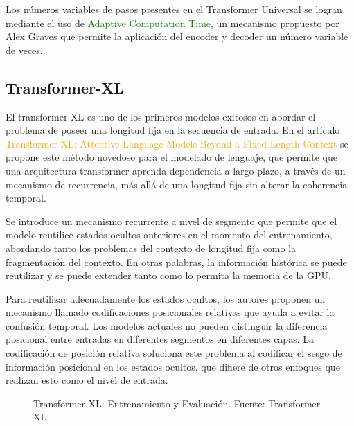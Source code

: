 \documentclass[conference]{IEEEtran}
\begin{document}
Los n\'umeros variables de pasos presentes en el Transformer Universal se logran mediante el uso de \textcolor{green}{Adaptive Computation Time}, un mecanismo propuesto por Alex Graves \cite{b6} que permite la aplicaci\'on del encoder y decoder un n\'umero variable de veces.
	
\vspace{0.2cm}

\subsection{Transformer-XL}

El transformer-XL es uno de los primeros modelos exitosos en abordar el problema de poseer una longitud fija en la secuencia de entrada. En el art\'iculo \textcolor{orange}{Transformer-XL: Attentive Language Models Beyond a Fixed-Length Context} \cite{b7} se propone este m\'etodo novedoso para el modelado de lenguaje, que permite que una arquitectura transformer aprenda dependencia a largo plazo, a trav\'es de un mecanismo de recurrencia, m\'as all\'a de una longitud fija sin alterar la coherencia temporal.

\vspace{0.2cm}

Se introduce un mecanismo recurrente a nivel de segmento que permite que el modelo reutilice estados ocultos anteriores en el momento del entrenamiento, abordando tanto los problemas del contexto de longitud fija como la fragmentaci\'on del contexto. En otras palabras, la informaci\'on hist\'orica se puede reutilizar y se puede extender tanto como lo permita la memoria de la GPU.
	
\vspace{0.2cm}

Para reutilizar adecuadamente los estados ocultos, los autores proponen un mecanismo llamado codificaciones posicionales relativas  que ayuda a evitar la confusi\'on temporal. Los modelos actuales no pueden distinguir la diferencia posicional entre entradas en diferentes segmentos en diferentes capas. La codificaci\'on de posici\'on relativa soluciona este problema al codificar el sesgo de informaci\'on posicional en los estados ocultos, que difiere de otros enfoques que realizan esto como el nivel de entrada.

\begin{figure}[h]
\caption{Transformer XL: Entrenamiento y Evaluación. Fuente: Transformer XL \cite{b7}}
\end{figure}
\end{document}

